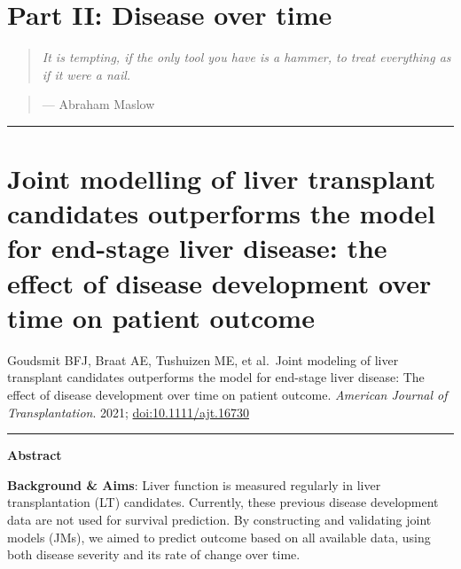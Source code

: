 \documentclass[11pt,english,]{book} %
\begin{document}
\hypertarget{part-ii-disease-over-time}{%
\chapter*{Part II: Disease over time}\label{part-ii-disease-over-time}}


\begin{quote}
\emph{It is tempting, if the only tool you have is a hammer, to treat everything as if it were a nail.}
\end{quote}

\begin{quote}
--- Abraham Maslow
\end{quote}

\begin{center}\rule{0.5\linewidth}{0.5pt}\end{center}

\newpage
\linespread{1}

\hypertarget{chap-jm}{%
\chapter{Joint modelling of liver transplant candidates outperforms the model for end-stage liver disease: the effect of disease development over time on patient outcome}\label{chap-jm}}


\vspace*{\fill}

\noindent  Goudsmit BFJ, Braat AE, Tushuizen ME, et al.~Joint modeling of liver transplant candidates outperforms the model for end-stage liver disease: The effect of disease development over time on patient outcome. \emph{American Journal of Transplantation}. 2021; \url{doi:10.1111/ajt.16730}

\begin{center}\rule{0.5\linewidth}{0.5pt}\end{center}

\noindent
\newpage
\nopagecolor
\color{black}
\small
\linespread{1.213}

\textbf{Abstract}

\textbf{Background \& Aims}: Liver function is measured regularly in liver transplantation (LT) candidates. Currently, these previous disease development data are not used for survival prediction. By constructing and validating joint models (JMs), we aimed to predict outcome based on all available data, using both disease severity and its rate of change over time.
\end{document}
